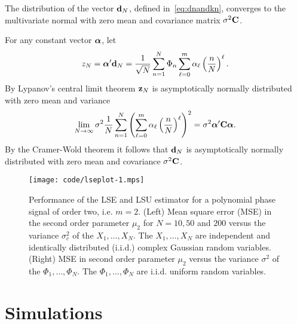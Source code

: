 \documentclass[journal]{IEEEtran}
\begin{document}
\begin{lemma}\label{eq:convdn}
The distribution of the vector $\mathbf{d}_N$, defined in~\eqref{eq:dnandkn}, converges to the multivariate normal with zero mean and covariance matrix $\sigma^2\mathbf{C}$.
\end{lemma}
\begin{IEEEproof}
For any constant vector $\boldsymbol{\alpha}$, let
\[
z_N = \boldsymbol{\alpha}^\prime \mathbf{d}_N = \frac{1}{\sqrt{N}} \sum_{n=1}^{N} \Phi_n \sum_{\ell=0}^{m}\alpha_\ell\left( \frac{n}{N} \right)^\ell.
\]
By Lypanov's central limit theorem $\mathbf{z}_N$ is asymptotically normally distributed with zero mean and variance
\[
\lim_{N\rightarrow\infty} \sigma^2 \frac{1}{N} \sum_{n=1}^{N}\left( \sum_{\ell=0}^{m}\alpha_\ell\left( \frac{n}{N} \right)^\ell \right)^2 = \sigma^2 \boldsymbol{\alpha}^\prime \mathbf{C} \boldsymbol{\alpha}.
\]
By the Cramer-Wold theorem it follows that $\mathbf{d}_N$ is asymptotically normally distributed with zero mean and covariance $\sigma^2 \mathbf{C}$. 
\end{IEEEproof}

\begin{figure*}[tb] 
   	\centering 
  		\texttt{[image: code/lseplot-1.mps]} 
   		\caption{Performance of the LSE and LSU estimator for a polynomial phase signal of order two, i.e. $m=2$.  (Left) Mean square error (MSE) in the second order parameter $\mu_2$ for $N=10,50$ and $200$ versus the variance $\sigma_c^2$ of the $X_1, \dots, X_N$. The $X_1, \dots, X_N$ are independent and identically distributed (i.i.d.) complex Gaussian random variables.  (Right) MSE in second order parameter $\mu_2$ versus the variance $\sigma^2$ of the $\Phi_1, \dots, \Phi_N$. The $\Phi_1, \dots, \Phi_N$ are i.i.d. uniform random variables.} 
   		\label{plot:lsetest} 
  \end{figure*} 

 
\section{Simulations}\label{sec:simulations} 
 
\end{document}
